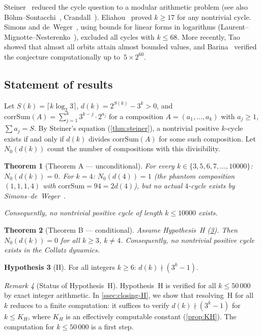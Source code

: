 \documentclass[11pt, a4paper]{amsart}
\theoremstyle{plain}
\newtheorem{theorem}{Theorem}[section]
\theoremstyle{definition}
\newtheorem{hypothesis}[theorem]{Hypothesis}
\theoremstyle{remark}
\newtheorem{remark}[theorem]{Remark}
\newcommand{\corrSum}{\mathrm{corrSum}}
\begin{document}
Steiner~\cite{Steiner1977} reduced the cycle question to a
modular arithmetic problem
(see also B\"ohm--Sontacchi~\cite{BoehmSontacchi1978},
Crandall~\cite{Crandall1978}).
Eliahou~\cite{Eliahou1993} proved $k \geq 17$ for any
nontrivial cycle.
Simons and de~Weger~\cite{SimonsDeWeger2005}, using bounds for
linear forms in logarithms (Laurent--Mignotte--Nesterenko~\cite{LMN1995}),
excluded all cycles with $k \leq 68$.
More recently, Tao~\cite{Tao2022} showed that almost all
orbits attain almost bounded values, and Barina~\cite{Barina2021}
verified the conjecture computationally up to~$5 \times 2^{60}$.

\subsection{Statement of results}\label{ssec:results}

Let $S(k) = \lceil k \log_2 3 \rceil$,
$d(k) = 2^{S(k)} - 3^k > 0$, and
$\corrSum(A) = \sum_{j=1}^{k} 3^{k-j} \cdot 2^{a_j}$
for a composition $A = (a_1, \ldots, a_k)$ with
$a_j \geq 1$, $\sum a_j = S$.
By Steiner's equation (\cref{thm:steiner}), a nontrivial positive
$k$-cycle exists if and only if $d(k)$ divides $\corrSum(A)$ for
some such composition.  Let $N_0(d(k))$ count the number of
compositions with this divisibility.

\begin{theorem}[Theorem A --- unconditional]\label{thm:A}
  For every $k \in \{3, 5, 6, 7, \ldots, 10000\}$:
  $N_0(d(k)) = 0$.
  For $k = 4$: $N_0(d(4)) = 1$ (the phantom composition
  $(1,1,1,4)$ with $\corrSum = 94 = 2d(4)$), but no actual
  $4$-cycle exists by Simons--de~Weger~\cite{SimonsDeWeger2005}.

  Consequently, no nontrivial positive cycle of length
  $k \leq 10000$ exists.
\end{theorem}

\begin{theorem}[Theorem B --- conditional]\label{thm:B}
  Assume Hypothesis~H (\cref{hyp:H}).
  Then $N_0(d(k)) = 0$ for all $k \geq 3$, $k \neq 4$.
  Consequently, no nontrivial positive cycle exists in the
  Collatz dynamics.
\end{theorem}

\begin{hypothesis}[H]\label{hyp:H}
  For all integers $k \geq 6$:
  \;$d(k) \nmid (3^k - 1)$.
\end{hypothesis}

\begin{remark}[Status of Hypothesis~H]\label{rem:H-status}
  Hypothesis~H is verified for all $k \leq 50\,000$ by exact
  integer arithmetic.  In \cref{ssec:closing-H}, we show that
  resolving~H for all~$k$ reduces to a finite computation:
  it suffices to verify $d(k) \nmid (3^k-1)$ for
  $k \leq K_H$, where $K_H$ is an effectively computable
  constant (\cref{prop:KH}).  The computation for
  $k \leq 50\,000$ is a first step.
\end{remark}
\end{document}
